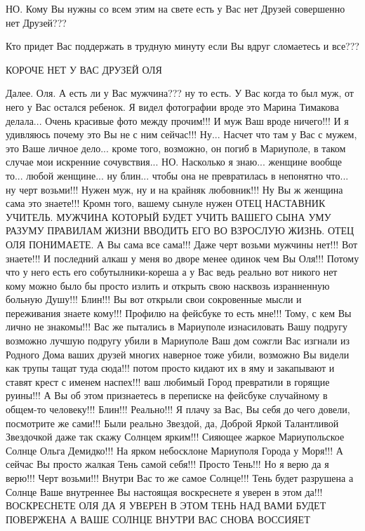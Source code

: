 НО. Кому Вы нужны со всем этим на свете есть у Вас нет Друзей совершенно нет
Друзей???

Кто придет Вас поддержать в трудную минуту если Вы вдруг сломаетесь и все???

КОРОЧЕ НЕТ У ВАС ДРУЗЕЙ ОЛЯ

Далее. Оля. А есть ли у Вас мужчина??? ну то есть. У Вас когда то был муж, от
него у Вас остался ребенок. Я видел фотографии вроде это Марина Тимакова
делала...  Очень красивые фото между прочим!!! И муж Ваш вроде ничего!!! И я
удивляюсь почему это Вы не с ним сейчас!!!  Ну... Насчет что там у Вас с мужем,
это Ваше личное дело...  кроме того, возможно, он погиб в Мариуполе, в таком
случае мои искренние сочувствия...  НО. Насколько я знаю... женщине вообще
то... любой женщине... ну блин... чтобы она не превратилась в непонятно что...
ну черт возьми!!! Нужен муж, ну и на крайняк любовник!!! Ну Вы ж женщина сама
это знаете!!! Кромн того, вашему сынуле нужен ОТЕЦ НАСТАВНИК УЧИТЕЛЬ. МУЖЧИНА
КОТОРЫЙ БУДЕТ УЧИТЬ ВАШЕГО СЫНА УМУ РАЗУМУ ПРАВИЛАМ ЖИЗНИ ВВОДИТЬ ЕГО ВО
ВЗРОСЛУЮ ЖИЗНЬ. ОТЕЦ ОЛЯ ПОНИМАЕТЕ.  А Вы сама все сама!!! Даже черт возьми
мужчины нет!!! Вот знаете!!! И последний алкаш у меня во дворе менее одинок чем
Вы Оля!!! Потому что у него есть его собутылники-кореша а у Вас ведь реально
вот никого нет кому можно было бы просто излить и открыть свою насквозь
изранненную больную Душу!!!  Блин!!! Вы вот открыли свои сокровенные мысли и
переживания знаете кому!!!  Профилю на фейсбуке то есть мне!!! Тому, с кем Вы
лично не знакомы!!! Вас же пытались в Мариуполе изнасиловать Вашу подругу
возможно лучшую подругу убили в Мариуполе Ваш дом сожгли Вас изгнали из Родного
Дома ваших друзей многих наверное тоже убили, возможно Вы видели как трупы
тащат туда сюда!!! потом просто кидают их в яму и закапывают и ставят крест с
именем наспех!!! ваш любимый Город превратили в горящие руины!!! А Вы об этом
признаетесь в переписке на фейсбуке случайному в общем-то человеку!!!  Блин!!!
Реально!!! Я плачу за Вас, Вы себя до чего довели, посмотрите же сами!!!  Были
реально Звездой, да, Доброй Яркой Талантливой Звездочкой даже так скажу Солнцем
ярким!!! Сияющее жаркое Мариупольское Солнце Ольга Демидко!!! На ярком
небосклоне Мариуполя Города у Моря!!! А сейчас Вы просто жалкая Тень самой
себя!!!  Просто Тень!!! Но я верю да я верю!!! Черт возьми!!! Внутри Вас то же
самое Солнце!!!  Тень будет разрушена а Солнце Ваше внутреннее Вы настоящая
воскреснете я уверен в этом да!!! ВОСКРЕСНЕТЕ ОЛЯ ДА Я УВЕРЕН В ЭТОМ ТЕНЬ НАД
ВАМИ БУДЕТ ПОВЕРЖЕНА А ВАШЕ СОЛНЦЕ ВНУТРИ ВАС СНОВА ВОССИЯЕТ

